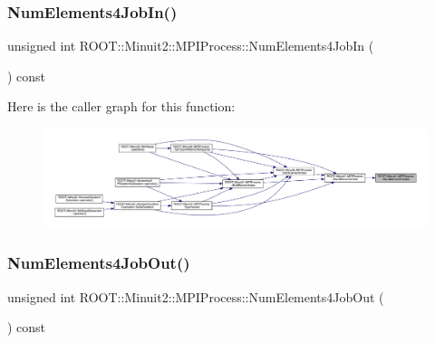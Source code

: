 \mbox{\label{classROOT_1_1Minuit2_1_1MPIProcess_ada3f8f6f1b28844db6cb6bd717521ffd}} 
\subsubsection{\texorpdfstring{NumElements4JobIn()}{NumElements4JobIn()}\hspace{0.1cm}{\footnotesize\ttfamily [2/2]}}
{\footnotesize\ttfamily unsigned int R\+O\+O\+T\+::\+Minuit2\+::\+M\+P\+I\+Process\+::\+Num\+Elements4\+Job\+In (\begin{DoxyParamCaption}{ }\end{DoxyParamCaption}) const\hspace{0.3cm}{\ttfamily [inline]}}

Here is the caller graph for this function\+:\nopagebreak
\begin{figure}[H]
\begin{center}
\leavevmode
\includegraphics[width=350pt]{dc/d43/classROOT_1_1Minuit2_1_1MPIProcess_ada3f8f6f1b28844db6cb6bd717521ffd_icgraph}
\end{center}
\end{figure}
\mbox{\label{classROOT_1_1Minuit2_1_1MPIProcess_a8ab54fbeb2dd760265e0121573361c3f}} 
\subsubsection{\texorpdfstring{NumElements4JobOut()}{NumElements4JobOut()}\hspace{0.1cm}{\footnotesize\ttfamily [1/2]}}
{\footnotesize\ttfamily unsigned int R\+O\+O\+T\+::\+Minuit2\+::\+M\+P\+I\+Process\+::\+Num\+Elements4\+Job\+Out (\begin{DoxyParamCaption}{ }\end{DoxyParamCaption}) const\hspace{0.3cm}{\ttfamily [inline]}}

